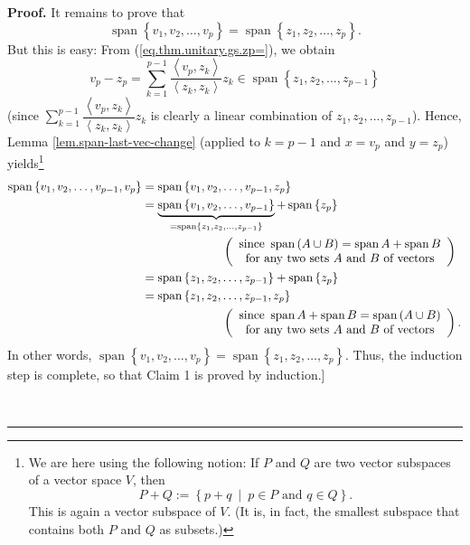 \documentclass[numbers=enddot,12pt,final,onecolumn,notitlepage]{scrartcl}%
\numberwithin{exer}{subsection}
\theoremstyle{definition}
\newenvironment{proof}[1][Proof]{\noindent\textbf{#1.} }{\ \rule{0.5em}{0.5em}}
\let\sumnonlimits\sum
\renewcommand{\sum}{\sumnonlimits\limits}
\begin{document}
\begin{proof}
It remains to prove that
\[
\operatorname*{span}\left\{  v_{1},v_{2},\ldots,v_{p}\right\}
=\operatorname*{span}\left\{  z_{1},z_{2},\ldots,z_{p}\right\}  .
\]
But this is easy: From (\ref{eq.thm.unitary.gs.zp=}), we obtain%
\[
v_{p}-z_{p}=\sum_{k=1}^{p-1}\dfrac{\left\langle v_{p},z_{k}\right\rangle
}{\left\langle z_{k},z_{k}\right\rangle }z_{k}\in\operatorname*{span}\left\{
z_{1},z_{2},\ldots,z_{p-1}\right\}
\]
(since $\sum_{k=1}^{p-1}\dfrac{\left\langle v_{p},z_{k}\right\rangle
}{\left\langle z_{k},z_{k}\right\rangle }z_{k}$ is clearly a linear
combination of $z_{1},z_{2},\ldots,z_{p-1}$). Hence, Lemma
\ref{lem.span-last-vec-change} (applied to $k=p-1$ and $x=v_{p}$ and $y=z_{p}%
$) yields\footnote{We are here using the following notion: If $P$ and $Q$ are
two vector subspaces of a vector space $V$, then
\[
P+Q:=\left\{  p+q\ \mid\ p\in P\text{ and }q\in Q\right\}  .
\]
This is again a vector subspace of $V$. (It is, in fact, the smallest subspace
that contains both $P$ and $Q$ as subsets.)}%
\begin{align*}
\operatorname*{span}\left\{  v_{1},v_{2},\ldots,v_{p-1},v_{p}\right\}   &
=\operatorname*{span}\left\{  v_{1},v_{2},\ldots,v_{p-1},z_{p}\right\} \\
&  =\underbrace{\operatorname*{span}\left\{  v_{1},v_{2},\ldots,v_{p-1}%
\right\}  }_{=\operatorname*{span}\left\{  z_{1},z_{2},\ldots,z_{p-1}\right\}
}+\operatorname*{span}\left\{  z_{p}\right\} \\
&  \ \ \ \ \ \ \ \ \ \ \ \ \ \ \ \ \ \ \ \ \left(
\begin{array}
[c]{c}%
\text{since }\operatorname*{span}\left(  A\cup B\right)  =\operatorname*{span}%
A+\operatorname*{span}B\\
\text{for any two sets }A\text{ and }B\text{ of vectors}%
\end{array}
\right) \\
&  =\operatorname*{span}\left\{  z_{1},z_{2},\ldots,z_{p-1}\right\}
+\operatorname*{span}\left\{  z_{p}\right\} \\
&  =\operatorname*{span}\left\{  z_{1},z_{2},\ldots,z_{p-1},z_{p}\right\} \\
&  \ \ \ \ \ \ \ \ \ \ \ \ \ \ \ \ \ \ \ \ \left(
\begin{array}
[c]{c}%
\text{since }\operatorname*{span}A+\operatorname*{span}B=\operatorname*{span}%
\left(  A\cup B\right) \\
\text{for any two sets }A\text{ and }B\text{ of vectors}%
\end{array}
\right)  .
\end{align*}
In other words, $\operatorname*{span}\left\{  v_{1},v_{2},\ldots
,v_{p}\right\}  =\operatorname*{span}\left\{  z_{1},z_{2},\ldots
,z_{p}\right\}  $. Thus, the induction step is complete, so that Claim 1 is
proved by induction.] \medskip


\end{proof}
\end{document}
